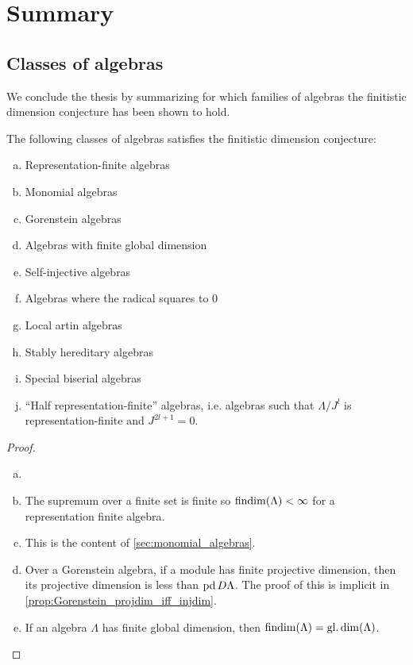 \section{Summary}\label{sec:summary}
\subsection{Classes of algebras}

We conclude the thesis by summarizing for which families of algebras the finitistic dimension conjecture has been shown to hold.

\begin{theorem}
	The following classes of algebras satisfies the finitistic dimension conjecture:
	\begin{enumerate}[a)]
		\item Representation-finite algebras
		\item Monomial algebras
		\item Gorenstein algebras
		\item Algebras with finite global dimension
		\item Self-injective algebras
		\item Algebras where the radical squares to 0
		\item Local artin algebras
		\item Stably hereditary algebras
		\item Special biserial algebras
		\item ``Half representation-finite'' algebras, i.e. algebras such that $\Lambda/J^l$ is representation-finite and $J^{2l+1}=0$.
	\end{enumerate}
	\begin{proof}
		\begin{enumerate}[(a)]
			\item[]
			\item The supremum over a finite set is finite so $\operatorname{findim}(\Lambda) < \infty$ for a representation finite algebra.
			\item This is the content of \cref{sec:monomial_algebras}.
			\item Over a Gorenstein algebra, if a module has finite projective dimension, then its projective dimension is less than $\operatorname{pd} D\Lambda$. The proof of this is implicit in \cref{prop:Gorenstein_projdim_iff_injdim}.
			\item If an algebra $\Lambda$ has finite global dimension, then $\operatorname{findim}(\Lambda) = \operatorname{gl.dim}(\Lambda)$.

\end{enumerate}
\end{proof}
\end{theorem}
